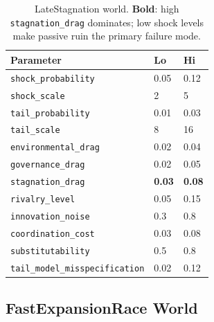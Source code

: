 \begin{table}[ht]
\centering
\small
\begin{tabularx}{\linewidth}{Xll}
\toprule
\textbf{Parameter} & \textbf{Lo} & \textbf{Hi} \\
\midrule
\texttt{shock\_probability} & 0.05 & 0.12 \\
\texttt{shock\_scale} & 2 & 5 \\
\texttt{tail\_probability} & 0.01 & 0.03 \\
\texttt{tail\_scale} & 8 & 16 \\
\texttt{environmental\_drag} & 0.02 & 0.04 \\
\texttt{governance\_drag} & 0.02 & 0.05 \\
\texttt{stagnation\_drag} & \textbf{0.03} & \textbf{0.08} \\
\texttt{rivalry\_level} & 0.05 & 0.15 \\
\texttt{innovation\_noise} & 0.3 & 0.8 \\
\texttt{coordination\_cost} & 0.03 & 0.08 \\
\texttt{substitutability} & 0.5 & 0.8 \\
\texttt{tail\_model\_misspecification} & 0.02 & 0.12 \\
\bottomrule
\end{tabularx}
\caption[LateStagnation world parameters]{LateStagnation world.
\textbf{Bold}: high \texttt{stagnation\_drag} dominates; low shock
levels make passive ruin the primary failure mode.}
\label{tab:world-late-stagnation}
\end{table}

\subsection{FastExpansionRace World}

